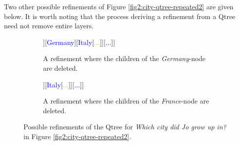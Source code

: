 \begin{exe}
	\label{ex2:subgraph}
	\label{ex2:qtree-refinement}
\end{exe}


Two other possible refinements of Figure \ref{fig2:city-qtree-repeated2} are given below. It is worth noting that the process deriving a refinement from a Qtree need not remove entire layers. 



\begin{figure}[H]
	\centering
	\begin{subfigure}[t]{.45\linewidth}
		\centering
		\begin{forest}
			[{CS\\
				Jo grew up in...}[\textcolor{blue}{France}[\textcolor{orange}{Paris}][\textcolor{orange}{Lyon}][\textcolor{orange}{...}]][\textcolor{blue}{Germany}][\textcolor{blue}{Italy}[\textcolor{orange}{...}]][\textcolor{blue}{...}]]
		\end{forest}
		\caption{A refinement where the children of the \textit{Germany}-node are deleted.}\label{fig2:city-qtree-trimmed1}
	\end{subfigure}\hfill
	\begin{subfigure}[t]{.45\linewidth}
		\centering
		\begin{forest}
			[{CS\\
				Jo grew up in...}[\textcolor{blue}{France}][\textcolor{blue}{Germany} [\textcolor{orange}{Berlin}][\textcolor{orange}{...}]][\textcolor{blue}{Italy}[\textcolor{orange}{...}]][\textcolor{blue}{...}]]
		\end{forest}
		\caption{A refinement where the children of the \textit{France}-node are deleted.}\label{fig2:city-qtree-trimmed2}
	\end{subfigure}
	\caption{Possible refinements of the Qtree for \textit{Which city did Jo grow up in?} in Figure \ref{fig2:city-qtree-repeated2}.}\label{fig2:qtrees-trimmed}
\end{figure}




